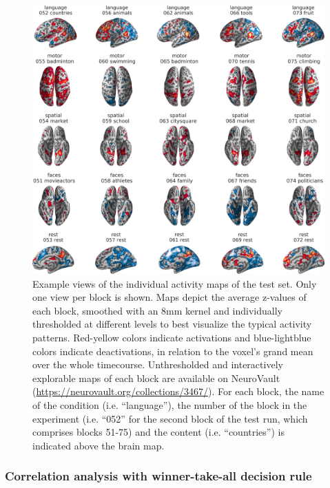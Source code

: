 \documentclass[fleqn,10pt]{SelfArx} %
\begin{document}
\begin{figure}[htbp]
	\begin{minipage}{\textwidth}
		\renewcommand{\familydefault}{\sfdefault}\normalfont
		\centering
		\includegraphics[width=\columnwidth]{./figs/fig6_blockTestBrains.png}
				\vspace*{-3mm}
		\caption{Example views of the individual activity maps of the test set. Only one view per block is shown. Maps depict the average z-values of each block, smoothed with an 8mm kernel and individually thresholded at different levels to best visualize the typical activity patterns. Red-yellow colors indicate activations and blue-lightblue colors indicate deactivations, in relation to the voxel's grand mean over the whole timecourse. Unthresholded and interactively explorable maps of each block are available on NeuroVault (\href{https://neurovault.org/collections/3467/}{https://neurovault.org/collections/3467/}). For each block, the name of the condition (i.e. “language”), the number of the block in the experiment (i.e. “052” for the second block of the test run, which comprises blocks 51-75) and the content (i.e. “countries”) is indicated above the brain map.}%
		\label{fig:testBrains}
	\end{minipage}
\end{figure}


\subsubsection*{Correlation analysis with winner-take-all decision rule}
\end{document}
